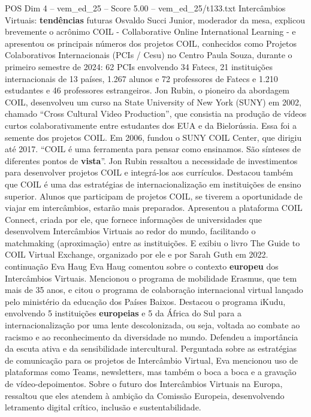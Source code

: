\begin{textsample}{POS Dim 4 – vem\_ed\_25 – Score 5.00 – vem\_ed\_25/t133.txt}  \label{ex:f4_pos_053}
Intercâmbios Virtuais: \textbf{tendências} futuras Osvaldo Succi Junior, moderador da mesa, explicou brevemente o acrônimo COIL - Collaborative Online International Learning - e apresentou os principais números dos projetos COIL, conhecidos como Projetos Colaborativos Internacionais (PCIs / Cesu) no Centro Paula Souza, durante o primeiro semestre de 2024: 62 PCIs envolvendo 34 Fatecs, 21 instituições internacionais de 13 países, 1.267 alunos e 72 professores de Fatecs e 1.210 estudantes e 46 professores estrangeiros.
Jon Rubin, o pioneiro da abordagem COIL, desenvolveu um curso na State University of New York (SUNY) em 2002, chamado “Cross Cultural Video Production”, que consistia na produção de vídeos curtos colaborativamente entre estudantes dos EUA e da Bielorússia.
Essa foi a semente dos projetos COIL.
Em 2006, fundou o SUNY COIL Center, que dirigiu até 2017. “COIL é uma ferramenta para pensar como ensinamos.
São sínteses de diferentes pontos de \textbf{vista}”.
Jon Rubin ressaltou a necessidade de investimentos para desenvolver projetos COIL e integrá-los aos currículos.
Destacou também que COIL é uma das estratégias de internacionalização em instituições de ensino superior.
Alunos que participam de projetos COIL, se tiverem a oportunidade de viajar em intercâmbios, estarão mais preparados.
Apresentou a plataforma COIL Connect, criada por ele, que fornece informações de universidades que desenvolvem Intercâmbios Virtuais ao redor do mundo, facilitando o matchmaking (aproximação) entre as instituições.
E exibiu o livro The Guide to COIL Virtual Exchange, organizado por ele e por Sarah Guth em 2022. continuação Eva Haug Eva Haug comentou sobre o contexto \textbf{europeu} dos Intercâmbios Virtuais.
Mencionou o programa de mobilidade Erasmus, que tem mais de 35 anos, e citou o programa de colaboração internacional virtual lançado pelo ministério da educação dos Países Baixos.
Destacou o programa iKudu, envolvendo 5 instituições \textbf{europeias} e 5 da África do Sul para a internacionalização por uma lente descolonizada, ou seja, voltada ao combate ao racismo e ao reconhecimento da diversidade no mundo.
Defendeu a importância da escuta ativa e da sensibilidade intercultural.
Perguntada sobre as estratégias de comunicação para os projetos de Intercâmbio Virtual, Eva mencionou uso de plataformas como Teams, newsletters, mas também o boca a boca e a gravação de vídeo-depoimentos.
Sobre o futuro dos Intercâmbios Virtuais na Europa, ressaltou que eles atendem à ambição da Comissão Europeia, desenvolvendo letramento digital crítico, inclusão e sustentabilidade.

\end{textsample}
